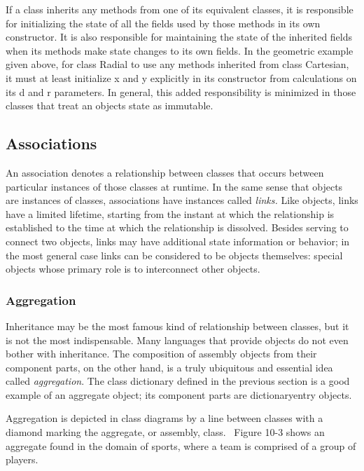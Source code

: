 If a class inherits any methods from one of its equivalent classes, it
is responsible for initializing the state of all the fields used by
those methods in its own constructor. It is also responsible for
maintaining the state of the inherited fields when its methods make
state changes to its own fields. In the geometric example given above,
for class \textsf{Radial} to use any methods inherited from class
\textsf{Cartesian}, it must at least initialize \textsf{x} and
\textsf{y} explicitly in its constructor from calculations on its
\textsf{d} and \textsf{r} parameters. In general, this added
responsibility is minimized in those classes that treat an
object{\textquotesingle}s state as immutable.

\subsection{Associations}

An association denotes a relationship between classes
that occurs between particular instances of those classes at runtime.
In the same sense that objects are instances of classes, associations
have instances called \textit{links.}
Like objects, links have a limited lifetime, starting from the instant
at which the relationship is established to the time at which the
relationship is dissolved. Besides serving to connect two objects,
links may have additional state information or behavior; in the most
general case links can be considered to be objects themselves: special
objects whose primary role is to interconnect other objects.

\subsubsection{Aggregation}

Inheritance may be the most famous kind of relationship between classes,
but it is not the most indispensable. Many languages that provide
objects do not even bother with inheritance. The composition of
assembly objects from their component parts, on the other hand, is a
truly ubiquitous and essential idea called
\textit{aggregation}. The class \textsf{dictionary}
defined in the previous section is a good example of an aggregate
object; its component parts are \textsf{dictionaryentry} objects.

Aggregation is depicted in class diagrams by a line between classes with
a diamond marking the aggregate, or assembly, class. \ Figure 10-3
shows an aggregate found in the domain of sports, where a team is
comprised of a group of players.

